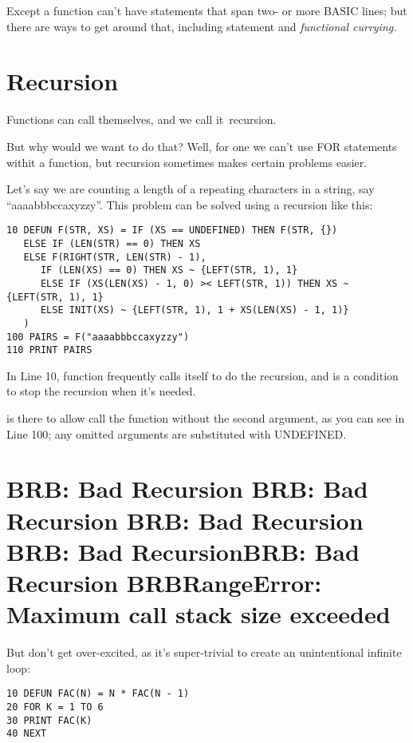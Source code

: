 \setcounter{curryingappearance}{\value{page}}
Except a function can't have statements that span two- or more BASIC lines; but there are ways to get around that, including  statement and \emph{functional currying.}

\section[Recursion]{Recursion}

Functions can call themselves, and we call it \,recursion.

But why would we want to do that? Well, for one we can't use FOR statements withit a function, but recursion sometimes makes certain problems easier.

Let's say we are counting a length of a repeating characters in a string, say ``aaaabbbccaxyzzy''. This problem can be solved using a recursion like this:

\begin{lstlisting}
10 DEFUN F(STR, XS) = IF (XS == UNDEFINED) THEN F(STR, {})
   ELSE IF (LEN(STR) == 0) THEN XS
   ELSE F(RIGHT(STR, LEN(STR) - 1),
      IF (LEN(XS) == 0) THEN XS ~ {LEFT(STR, 1), 1}
      ELSE IF (XS(LEN(XS) - 1, 0) >< LEFT(STR, 1)) THEN XS ~ {LEFT(STR, 1), 1}
      ELSE INIT(XS) ~ {LEFT(STR, 1), 1 + XS(LEN(XS) - 1, 1)}
   )
100 PAIRS = F("aaaabbbccaxyzzy")
110 PRINT PAIRS
\end{lstlisting}

In Line 10, function  frequently calls itself to do the recursion, and  is a condition to stop the recursion when it's needed.

 is there to allow call the function  without the second argument, as you can see in Line 100; any omitted arguments are substituted with UNDEFINED.

\section[When Recursion Goes Wild]{BRB: Bad Recursion BRB: Bad Recursion BRB: Bad Recursion BRB: Bad RecursionBRB: Bad Recursion BRBRangeError: Maximum call stack size exceeded}

But don't get over-excited, as it's super-trivial to create an unintentional infinite loop:

\begin{lstlisting}
10 DEFUN FAC(N) = N * FAC(N - 1)
20 FOR K = 1 TO 6
30 PRINT FAC(K)
40 NEXT
\end{lstlisting}

